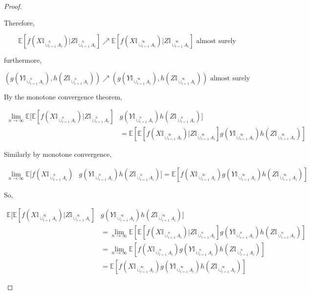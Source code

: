 \documentclass[12pt]{article}
\newcommand{\mb}{\mathbb}
\newcommand{\ra}{\rightarrow}
\newcommand{\te}{\text}
\newcommand{\ex}[1]{\mb{E}\left[#1\right]}			%
\newcommand{\Xf}{X}									%
\newcommand{\Xg}{Y}									%
\newcommand{\Xh}{Z}									%
\renewcommand{\it}[1]{_{#1}}						%
\newcommand{\typset}{A}							%
\begin{document}
\begin{proof}
\begin{enumerate}[(a)]
Therefore,

\[\ex{f(\Xf\mb{I}_{\dot{\cup}_{i=1}^n \typset\it{i}})|\Xh\mb{I}_{\dot{\cup}_{i=1}^n \typset\it{i}}} \nearrow \ex{f(\Xf\mb{I}_{\dot{\cup}_{i=1}^\infty \typset\it{i}})|\Xh\mb{I}_{\dot{\cup}_{i=1}^\infty \typset\it{i}}} \te{ almost surely}\]

furthermore, 

\[(g(\Xg\mb{I}_{\dot{\cup}_{i=1}^n \typset\it{i}}),h(\Xh\mb{I}_{\dot{\cup}_{i=1}^n \typset\it{i}})) \nearrow (g(\Xg\mb{I}_{\dot{\cup}_{i=1}^\infty \typset\it{i}}),h(\Xh\mb{I}_{\dot{\cup}_{i=1}^\infty  \typset\it{i}})) \te{ almost surely}\]

By the monotone convergence theorem,

\begin{align*}
\lim_{n\ra\infty} \mb{E}\bigg[\ex{f(\Xf\mb{I}_{\dot{\cup}_{i=1}^n \typset\it{i}})|\Xh\mb{I}_{\dot{\cup}_{i=1}^n \typset\it{i}}}&g(\Xg\mb{I}_{\dot{\cup}_{i=1}^n \typset\it{i}})h(\Xh\mb{I}_{\dot{\cup}_{i=1}^n \typset\it{i}})\bigg]\\
& = \ex{\ex{f(\Xf\mb{I}_{\dot{\cup}_{i=1}^\infty \typset\it{i}})|\Xh\mb{I}_{\dot{\cup}_{i=1}^\infty \typset\it{i}}}g(\Xg\mb{I}_{\dot{\cup}_{i=1}^\infty \typset\it{i}})h(\Xh\mb{I}_{\dot{\cup}_{i=1}^\infty \typset\it{i}})}
\end{align*}

Similarly by monotone convergence,

\begin{align*}
\lim_{n\ra\infty} \mb{E}\bigg[f(\Xf\mb{I}_{\dot{\cup}_{i=1}^n \typset\it{i}})&g(\Xg\mb{I}_{\dot{\cup}_{i=1}^n \typset\it{i}})h(\Xh\mb{I}_{\dot{\cup}_{i=1}^n \typset\it{i}})\bigg] = \ex{f(\Xf\mb{I}_{\dot{\cup}_{i=1}^\infty \typset\it{i}})g(\Xg\mb{I}_{\dot{\cup}_{i=1}^\infty \typset\it{i}})h(\Xh\mb{I}_{\dot{\cup}_{i=1}^\infty \typset\it{i}})}
\end{align*}

So,

\begin{align*}
\mb{E}\bigg[\ex{f(\Xf\mb{I}_{\dot{\cup}_{i=1}^\infty \typset\it{i}})|\Xh\mb{I}_{\dot{\cup}_{i=1}^\infty \typset\it{i}}}&g(\Xg\mb{I}_{\dot{\cup}_{i=1}^\infty \typset\it{i}})h(\Xh\mb{I}_{\dot{\cup}_{i=1}^\infty \typset\it{i}})\bigg]\\
&= \lim_{n\ra\infty} \ex{\ex{f(\Xf\mb{I}_{\dot{\cup}_{i=1}^n \typset\it{i}})|\Xh\mb{I}_{\dot{\cup}_{i=1}^n \typset\it{i}}}g(\Xg\mb{I}_{\dot{\cup}_{i=1}^n \typset\it{i}})h(\Xh\mb{I}_{\dot{\cup}_{i=1}^n \typset\it{i}})}\\
&= \lim_{n\ra\infty} \ex{f(\Xf\mb{I}_{\dot{\cup}_{i=1}^n \typset\it{i}})g(\Xg\mb{I}_{\dot{\cup}_{i=1}^n \typset\it{i}})h(\Xh\mb{I}_{\dot{\cup}_{i=1}^n \typset\it{i}})}\\
&= \ex{f(\Xf\mb{I}_{\dot{\cup}_{i=1}^\infty \typset\it{i}})g(\Xg\mb{I}_{\dot{\cup}_{i=1}^\infty \typset\it{i}})h(\Xh\mb{I}_{\dot{\cup}_{i=1}^\infty \typset\it{i}})}
\end{align*}


\end{enumerate}
\end{proof}
\end{document}
